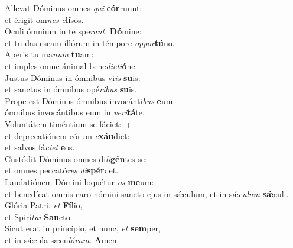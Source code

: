 \evenverse Allevat Dóminus omnes \textit{qui} \textbf{cór}ruunt:~\*\\
\evenverse et érigit om\textit{nes} \textit{e}\textbf{lí}sos.\\
\oddverse Oculi ómnium in te spe\textit{rant}, \textbf{Dó}mine:~\*\\
\oddverse et tu das escam illórum in témpore \textit{op}\textit{por}\textbf{tú}no.\\
\evenverse Aperis tu ma\textit{num} \textbf{tu}am:~\*\\
\evenverse et imples omne ánimal bene\textit{di}\textit{cti}\textbf{ó}ne.\\
\oddverse Justus Dóminus in ómnibus vi\textit{is} \textbf{su}is:~\*\\
\oddverse et sanctus in ómnibus opé\textit{ri}\textit{bus} \textbf{su}is.\\
\evenverse Prope est Dóminus ómnibus invocánti\textit{bus} \textbf{e}um:~\*\\
\evenverse ómnibus invocántibus eum in \textit{ve}\textit{ri}\textbf{tá}te.\\
\oddverse Voluntátem timéntium se fáciet:~+\\
\oddverse  et deprecatiónem eórum \textit{e}\textbf{xáu}diet:~\*\\
\oddverse et salvos fá\textit{ci}\textit{et} \textbf{e}os.\\
\evenverse Custódit Dóminus omnes di\textit{li}\textbf{gén}tes se:~\*\\
\evenverse et omnes peccató\textit{res} \textit{di}\textbf{spér}det.\\
\oddverse Laudatiónem Dómini loquétur \textit{os} \textbf{me}um:~\*\\
\oddverse et benedícat omnis caro nómini sancto ejus in sǽculum, et in sǽ\textit{cu}\textit{lum} \textbf{sǽ}culi.\\
\evenverse Glória Patri, \textit{et} \textbf{Fí}lio,~\*\\
\evenverse et Spirí\textit{tu}\textit{i} \textbf{San}cto.\\
\oddverse Sicut erat in princípio, et nunc, \textit{et} \textbf{sem}per,~\*\\
\oddverse et in sǽcula sæcu\textit{ló}\textit{rum}. \textbf{A}men.\\
